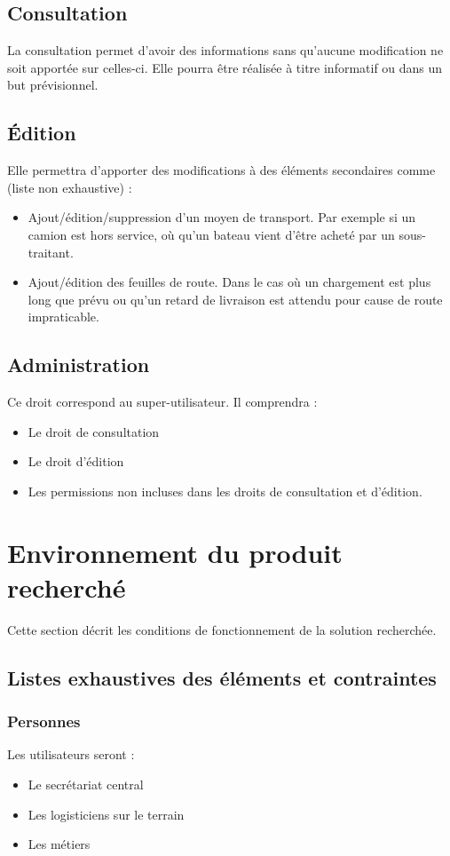 \documentclass[11pt,fleqn]{book} %
\begin{document}
\subsection{Consultation}
La consultation permet d'avoir des informations sans qu'aucune modification ne soit apportée sur celles-ci. Elle pourra être réalisée à titre informatif ou dans un but prévisionnel.

\subsection{Édition}
Elle permettra d'apporter des modifications à des éléments secondaires comme (liste non exhaustive) :
\begin{itemize}
\item Ajout/édition/suppression d'un moyen de transport. Par exemple si un camion est hors service, où qu'un bateau vient d'être acheté par un sous-traitant.
\item Ajout/édition des feuilles de route. Dans le cas où un chargement est plus long que prévu ou qu'un retard de livraison est attendu pour cause de route impraticable.
\end{itemize}

\subsection{Administration}
Ce droit correspond au super-utilisateur. Il comprendra :
\begin{itemize}
\item Le droit de consultation
\item Le droit d'édition
\item Les permissions non incluses dans les droits de consultation et d'édition.
\end{itemize}

\section{Environnement du produit recherché}
Cette section décrit les conditions de fonctionnement de la solution recherchée.

\subsection{Listes exhaustives des éléments et contraintes}

\subsubsection{Personnes}
Les utilisateurs seront :
\begin{itemize}
\item Le secrétariat central
\item Les logisticiens sur le terrain
\item Les métiers
\end{itemize}
\end{document}
